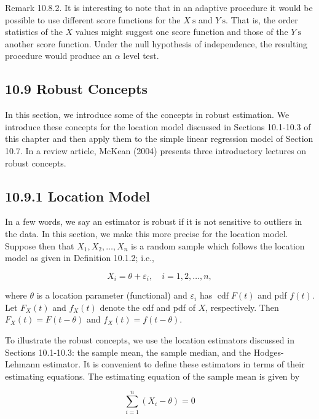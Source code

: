 Remark 10.8.2. It is interesting to note that in an adaptive procedure it would be possible to use different score functions for the $X \mathrm{~s}$ and $Y \mathrm{~s}$. That is, the order statistics of the $X$ values might suggest one score function and those of the $Y \mathrm{~s}$ another score function. Under the null hypothesis of independence, the resulting procedure would produce an $\alpha$ level test.

\subsection*{10.9 Robust Concepts}
In this section, we introduce some of the concepts in robust estimation. We introduce these concepts for the location model discussed in Sections 10.1-10.3 of this chapter and then apply them to the simple linear regression model of Section 10.7. In a review article, McKean (2004) presents three introductory lectures on robust concepts.

\subsection*{10.9.1 Location Model}
In a few words, we say an estimator is robust if it is not sensitive to outliers in the data. In this section, we make this more precise for the location model. Suppose then that $X_{1}, X_{2}, \ldots, X_{n}$ is a random sample which follows the location model as given in Definition 10.1.2; i.e.,


\begin{equation*}
X_{i}=\theta+\varepsilon_{i}, \quad i=1,2, \ldots, n, \tag{10.9.1}
\end{equation*}


where $\theta$ is a location parameter (functional) and $\varepsilon_{i}$ has $\operatorname{cdf} F(t)$ and pdf $f(t)$. Let $F_{X}(t)$ and $f_{X}(t)$ denote the cdf and pdf of $X$, respectively. Then $F_{X}(t)=F(t-\theta)$ and $f_{X}(t)=f(t-\theta)$.

To illustrate the robust concepts, we use the location estimators discussed in Sections 10.1-10.3: the sample mean, the sample median, and the Hodges-Lehmann estimator. It is convenient to define these estimators in terms of their estimating equations. The estimating equation of the sample mean is given by


\begin{equation*}
\sum_{i=1}^{n}\left(X_{i}-\theta\right)=0 \tag{10.9.2}
\end{equation*}



